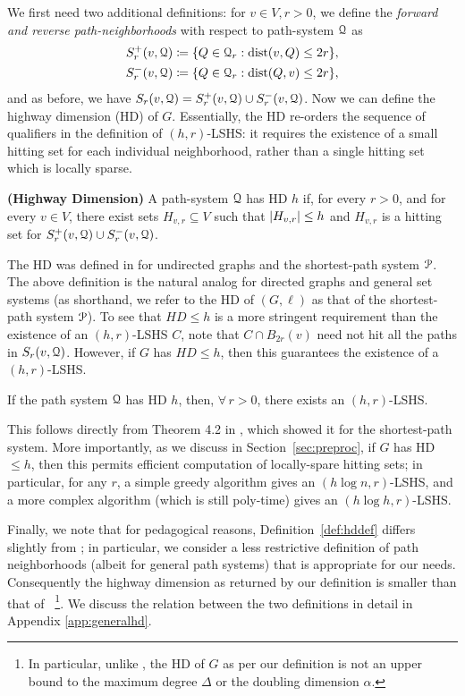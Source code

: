 We first need two additional definitions:
for $v\in V, r>0$, we define the \emph{forward and reverse path-neighborhoods} with respect to path-system $\mathcal{Q}$ as 
\begin{align*}
S_r^+(v,\calQ) &\defeq\crl*{Q\in\calQ_r: \dist(v,Q)\leq 2r}, \\  
S_r^-(v,\calQ) &\defeq\crl*{Q\in\calQ_r: \dist(Q,v)\leq 2r},
\end{align*}
and as before, we have $S_r(v,\mathcal{Q}) = S_r^+(v,\mathcal{Q})\cup S_r^-(v,\mathcal{Q})$. Now we can define the highway dimension (HD) of $G$. Essentially, the HD re-orders the sequence of qualifiers in the definition of $(h,r)$-LSHS: it requires the existence of a small hitting set for each individual neighborhood, rather than a single hitting set which is locally sparse. 
\begin{definition}
\label{def:hddef}
\textbf{(Highway Dimension)}
A path-system $\mathcal{Q}$ has HD $h$ if, for every $r>0$, and for every $v\in V$, there exist sets $H_{v,r}\subseteq V$ such that $\lvert H_{v,r}\rvert\leq h$ and $H_{v,r}$ is a hitting set for $S_r^+(v,\mathcal{Q})\cup S_r^-(v,\mathcal{Q})$.
\end{definition}
The HD was defined in \cite{highway2013} for undirected graphs and the shortest-path system $\mathcal{P}$. 
The above definition is the natural analog for directed graphs and general set systems (as shorthand, we refer to the HD of $(G,\ell)$ as that of the shortest-path system $\mathcal{P}$). 
To see that $HD\leq h$ is a more stringent requirement than the existence of an $(h,r)$-LSHS $C$, note that $C\cap B_{2r}(v)$ need not hit all the paths in $S_r(v,\mathcal{Q})$. 
However, if $G$ has $HD\leq h$, then this guarantees the existence of a $(h,r)$-LSHS.
\begin{proposition}
If the path system $\mathcal{Q}$ has HD $h$, then, $\forall\,r>0$, there exists an $(h,r)$-LSHS.
\end{proposition}
This follows directly from Theorem 4.2 in \cite{highway2013}, which showed it for the shortest-path system. More importantly, as we discuss in Section~\ref{sec:preproc}, if $G$ has HD$\leq h$, then this permits efficient computation of locally-spare hitting sets; in particular, for any $r$, a simple greedy algorithm gives an $(h\log n,r)$-LSHS, and a more complex algorithm (which is still poly-time) gives an $(h\log h,r)$-LSHS.


Finally, we note that for pedagogical reasons, Definition~\ref{def:hddef} differs slightly from \cite{highway2013}; in particular, we consider a less restrictive definition of path neighborhoods (albeit for general path systems) that is appropriate for our needs. Consequently the highway dimension as returned by our definition is smaller than that of \cite{highway2013}~\footnote{In particular, unlike \cite{highway2013}, the HD of $G$ as per our definition is not an upper bound to the maximum degree $\Delta$ or the doubling dimension $\alpha$.}.
We discuss the relation between the two definitions in detail in Appendix \ref{app:generalhd}. 

